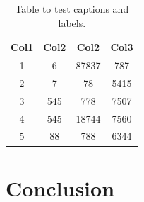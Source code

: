\documentclass{../class/tae-ufla-article}
\begin{document}
\begin{table}[h!]
\centering
\caption{Table to test captions and labels.}
\label{table:1}
\begin{tabular}{||c c c c||} 
 \hline
 Col1 & Col2 & Col2 & Col3 \\ [0.5ex] 
 \hline\hline
 1 & 6 & 87837 & 787 \\ 
 2 & 7 & 78 & 5415 \\
 3 & 545 & 778 & 7507 \\
 4 & 545 & 18744 & 7560 \\
 5 & 88 & 788 & 6344 \\ [1ex] 
 \hline
\end{tabular}
\end{table}
\lipsum[1]

\section{Conclusion}
\lipsum[1] \cite{texbook} \cite{latex:companion}




\printbibliography[title=References]
\end{document}
